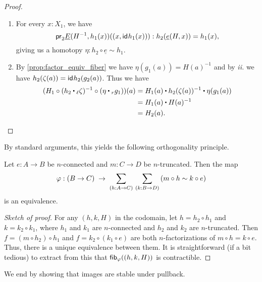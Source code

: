 \begin{proof}
\begin{enumerate}
\item For every $x:X_1$, we have
\begin{equation*}
\mathsf{pr}_{2}\underline{E}(H^{-1},h_1(x))({(x,\mathsf{id}_{}{h_1(x)})}):h_2(\underline{e}(H,x))= h_1(x),
\end{equation*}
giving us a homotopy $\eta:h_2\circ \underline{e}\sim h_1$.
\item By \autoref{prop:factor_equiv_fiber} we have $\eta(g_1(a))=H(a)^{-1}$ and by {\it ii.} we have
$h_2(\zeta(a))=\mathsf{id}_{}{h_2(g_2(a))}$. Thus we have
\begin{align*}
(H_1 \circ(h_2\leftwhisker\zeta)^{-1}\circ(\eta\rightwhisker g_1))(a) & = H_1(a)\ct h_2(\zeta(a))^{-1}\ct \eta(g_1(a))\\
& = H_1(a)\ct H(a)^{-1}\\
& = H_2(a).\qedhere
\end{align*}
\end{enumerate}
\end{proof}

%

By standard arguments, this yields the following orthogonality principle.

\begin{thm}
  Let $e:A\to B$ be $n$-connected and $m:C\to D$ be $n$-truncated.
  Then the map
  \[ \varphi: (B\to C) \;\to\; \sm{h:A\to C}{k:B\to D} (m\circ h \htpy k \circ e) \]
  is an equivalence.
\end{thm}
\begin{proof}[Sketch of proof]
  For any $(h,k,H)$ in the codomain, let $h = h_2 \circ h_1$ and $k = k_2 \circ k_1$, where $h_1$ and $k_1$ are $n$-connected and $h_2$ and $k_2$ are $n$-truncated.
  Then $f = (m\circ h_2) \circ h_1$ and $f = k_2 \circ (k_1\circ e)$ are both $n$-factorizations of $m \circ h = k\circ e$.
  Thus, there is a unique equivalence between them.
  It is straightforward (if a bit tedious) to extract from this that ${\mathsf{fib}}_{\varphi}((h,k,H))$ is contractible.
\end{proof}

We end by showing that images are stable under pullback.

